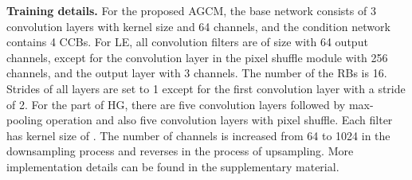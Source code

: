 \documentclass[10pt,twocolumn,letterpaper]{article}
\begin{document}
\textbf{Training details.} For the proposed AGCM, the base network consists of 3 convolution layers with  kernel size and 64 channels, and the condition network contains 4 CCBs. For LE, all convolution filters are of size  with 64 output channels, except for the convolution layer in the pixel shuffle module\cite{shi2016real} with 256 channels, and the output layer with 3 channels. The number of the RBs is 16. Strides of all layers are set to 1 except for the first convolution layer with a stride of 2. For the part of HG, there are five convolution layers followed by max-pooling operation and also five convolution layers with pixel shuffle. Each filter has kernel size of . The number of channels is increased from 64 to 1024 in the downsampling process and reverses in the process of upsampling. More implementation details can be found in the supplementary material. 
\end{document}

